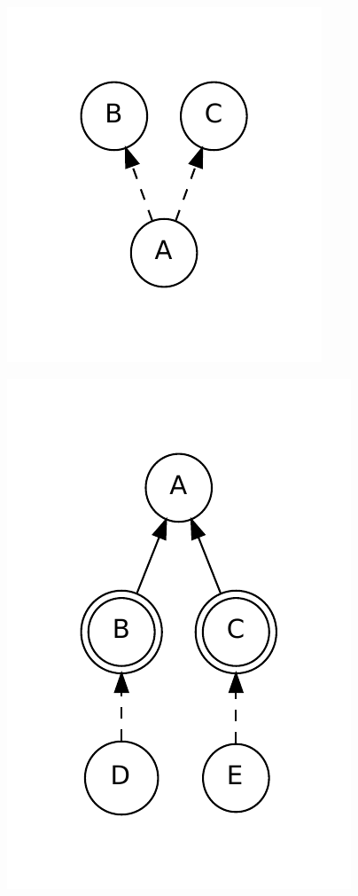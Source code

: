 \begin{figure}[t]
  \vspace{-5mm}
  \begin{minipage}[t]{0.5\linewidth}
    \centering
    \includegraphics[scale=0.6]{figures/complementation/single-1.pdf}
    \label{fig:single1}
  \end{minipage}
  \hspace{0.4in}
  \begin{minipage}[t]{0.5\linewidth}
    \centering
    \includegraphics[scale=0.6]{figures/complementation/single-2.pdf}

\end{minipage}
\end{figure}

